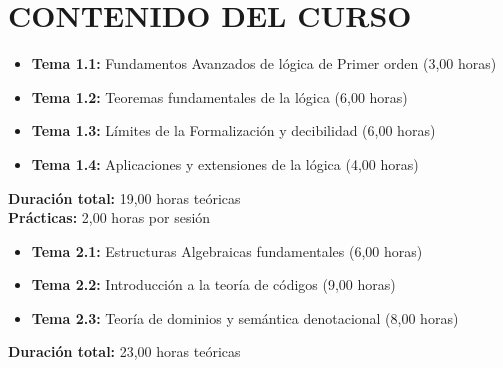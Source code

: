 \documentclass[12pt,a4paper]{article}
\begin{document}
\section{CONTENIDO DEL CURSO}

\begin{tcolorbox}[colback=white,colframe=pucpAzul,title=\textbf{UNIDAD 1: Lógica Matemática Avanzada}]
\begin{itemize}[leftmargin=*]
    \item \textbf{Tema 1.1:} Fundamentos Avanzados de lógica de Primer orden (3,00 horas)
    \item \textbf{Tema 1.2:} Teoremas fundamentales de la lógica (6,00 horas)
    \item \textbf{Tema 1.3:} Límites de la Formalización y decibilidad (6,00 horas)
    \item \textbf{Tema 1.4:} Aplicaciones y extensiones de la lógica (4,00 horas)
\end{itemize}
\textbf{Duración total:} 19,00 horas teóricas \\
\textbf{Prácticas:} 2,00 horas por sesión
\end{tcolorbox}

\begin{tcolorbox}[colback=white,colframe=pucpAzul,title=\textbf{UNIDAD 2: Matemática Discreta Avanzada}]
\begin{itemize}[leftmargin=*]
    \item \textbf{Tema 2.1:} Estructuras Algebraicas fundamentales (6,00 horas)
    \item \textbf{Tema 2.2:} Introducción a la teoría de códigos (9,00 horas)
    \item \textbf{Tema 2.3:} Teoría de dominios y semántica denotacional (8,00 horas)
\end{itemize}
\textbf{Duración total:} 23,00 horas teóricas
\end{tcolorbox}
\end{document}
